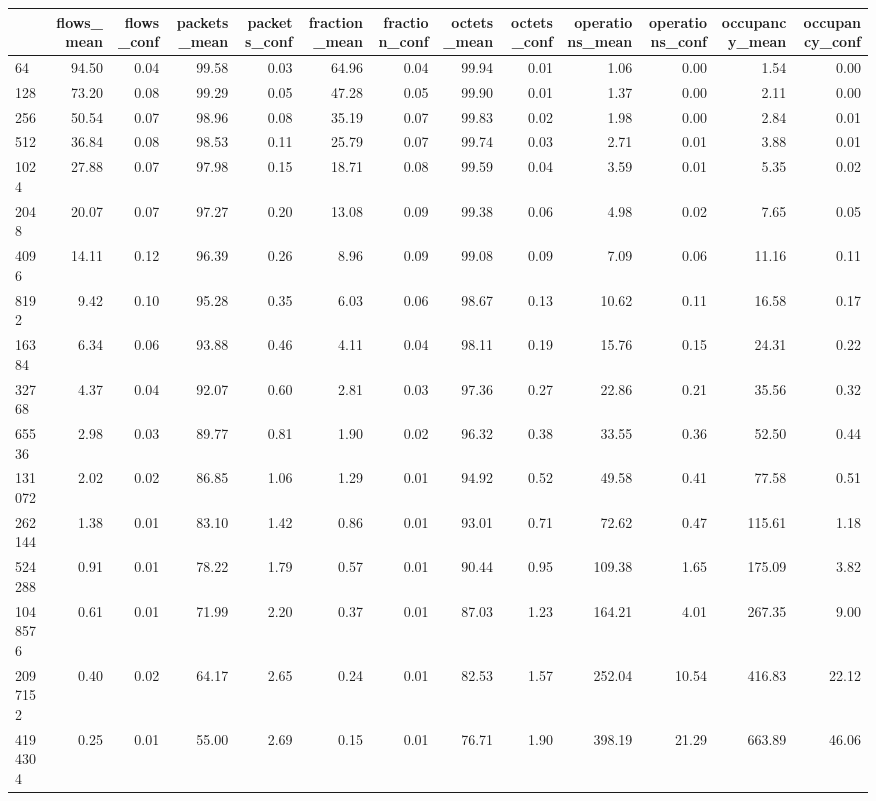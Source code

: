 \begin{tabular}{lrrrrrrrrrrrr}
\toprule
 & flows_mean & flows_conf & packets_mean & packets_conf & fraction_mean & fraction_conf & octets_mean & octets_conf & operations_mean & operations_conf & occupancy_mean & occupancy_conf \\
\midrule
64 & 94.50 & 0.04 & 99.58 & 0.03 & 64.96 & 0.04 & 99.94 & 0.01 & 1.06 & 0.00 & 1.54 & 0.00 \\
128 & 73.20 & 0.08 & 99.29 & 0.05 & 47.28 & 0.05 & 99.90 & 0.01 & 1.37 & 0.00 & 2.11 & 0.00 \\
256 & 50.54 & 0.07 & 98.96 & 0.08 & 35.19 & 0.07 & 99.83 & 0.02 & 1.98 & 0.00 & 2.84 & 0.01 \\
512 & 36.84 & 0.08 & 98.53 & 0.11 & 25.79 & 0.07 & 99.74 & 0.03 & 2.71 & 0.01 & 3.88 & 0.01 \\
1024 & 27.88 & 0.07 & 97.98 & 0.15 & 18.71 & 0.08 & 99.59 & 0.04 & 3.59 & 0.01 & 5.35 & 0.02 \\
2048 & 20.07 & 0.07 & 97.27 & 0.20 & 13.08 & 0.09 & 99.38 & 0.06 & 4.98 & 0.02 & 7.65 & 0.05 \\
4096 & 14.11 & 0.12 & 96.39 & 0.26 & 8.96 & 0.09 & 99.08 & 0.09 & 7.09 & 0.06 & 11.16 & 0.11 \\
8192 & 9.42 & 0.10 & 95.28 & 0.35 & 6.03 & 0.06 & 98.67 & 0.13 & 10.62 & 0.11 & 16.58 & 0.17 \\
16384 & 6.34 & 0.06 & 93.88 & 0.46 & 4.11 & 0.04 & 98.11 & 0.19 & 15.76 & 0.15 & 24.31 & 0.22 \\
32768 & 4.37 & 0.04 & 92.07 & 0.60 & 2.81 & 0.03 & 97.36 & 0.27 & 22.86 & 0.21 & 35.56 & 0.32 \\
65536 & 2.98 & 0.03 & 89.77 & 0.81 & 1.90 & 0.02 & 96.32 & 0.38 & 33.55 & 0.36 & 52.50 & 0.44 \\
131072 & 2.02 & 0.02 & 86.85 & 1.06 & 1.29 & 0.01 & 94.92 & 0.52 & 49.58 & 0.41 & 77.58 & 0.51 \\
262144 & 1.38 & 0.01 & 83.10 & 1.42 & 0.86 & 0.01 & 93.01 & 0.71 & 72.62 & 0.47 & 115.61 & 1.18 \\
524288 & 0.91 & 0.01 & 78.22 & 1.79 & 0.57 & 0.01 & 90.44 & 0.95 & 109.38 & 1.65 & 175.09 & 3.82 \\
1048576 & 0.61 & 0.01 & 71.99 & 2.20 & 0.37 & 0.01 & 87.03 & 1.23 & 164.21 & 4.01 & 267.35 & 9.00 \\
2097152 & 0.40 & 0.02 & 64.17 & 2.65 & 0.24 & 0.01 & 82.53 & 1.57 & 252.04 & 10.54 & 416.83 & 22.12 \\
4194304 & 0.25 & 0.01 & 55.00 & 2.69 & 0.15 & 0.01 & 76.71 & 1.90 & 398.19 & 21.29 & 663.89 & 46.06 \\

\end{tabular}
